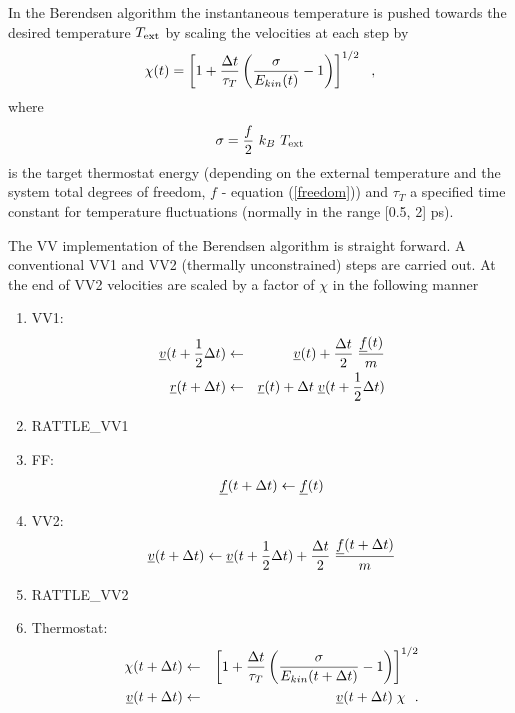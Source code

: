 In the Berendsen algorithm the instantaneous temperature is pushed
towards the desired temperature $T_{\rm ext}$ by scaling the
velocities at each step by
\begin{equation}
\chi (t) = \left[ 1 + {\Delta t \over \tau_{T}} \left(
{\sigma \over E_{kin}(t)} - 1 \right) \right]^{1/2}~~,
\end{equation}
where
\begin{equation}
\sigma = \frac{f}{2}~k_{B}~T_{\rm ext} \label{sigma}
\end{equation}
is the target thermostat energy (depending on the external
temperature and the system total degrees of freedom, $f$ -
equation (\ref{freedom})) and $\tau_{T}$ a specified time constant
for temperature fluctuations (normally in the range [0.5, 2] ps).

The VV implementation of the Berendsen algorithm is straight forward.
A conventional VV1 and VV2 (thermally unconstrained) steps are
carried out.  At the end of VV2 velocities are scaled by a factor
of $\chi$ in the following manner
\begin{enumerate}
\item VV1:
\begin{eqnarray}
\mbox{$\underline{v}$}(t + {1 \over 2} \Delta t) &\leftarrow& \mbox{$\underline{v}$}(t) +
{\Delta t \over 2} \; {\mbox{$\underline{f}$}(t) \over m} \nonumber \\
\mbox{$\underline{r}$}(t + \Delta t) &\leftarrow& \mbox{$\underline{r}$}(t) + \Delta t \;
\mbox{$\underline{v}$}(t + {1 \over 2} \Delta t)
\end{eqnarray}
\item RATTLE\_VV1
\item FF:
\begin{equation}
\mbox{$\underline{f}$}(t + \Delta t) \leftarrow \mbox{$\underline{f}$}(t)
\end{equation}
\item VV2:
\begin{equation}
\mbox{$\underline{v}$}(t + \Delta t) \leftarrow \mbox{$\underline{v}$}(t + {1 \over 2} \Delta t) +
{\Delta t \over 2} \; {\mbox{$\underline{f}$}(t + \Delta t) \over m}
\end{equation}
\item RATTLE\_VV2
\item Thermostat:
\begin{eqnarray}
\chi (t + \Delta t) &\leftarrow& \left[ 1 + {\Delta t \over \tau_{T}}
\left( {\sigma \over E_{kin}(t + \Delta t)} - 1 \right) \right]^{1/2} \nonumber \\
\mbox{$\underline{v}$}(t + \Delta t) &\leftarrow& \mbox{$\underline{v}$}(t + \Delta t) \; \chi~~.
\end{eqnarray}
\end{enumerate}

